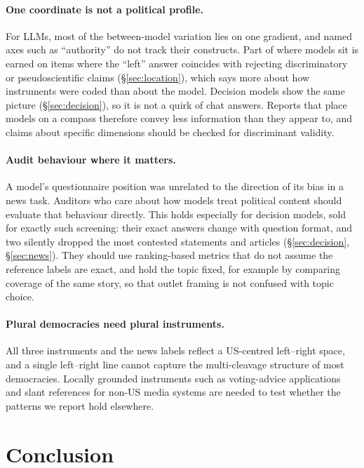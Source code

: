 \documentclass[11pt]{article}
\begin{document}
\paragraph{One coordinate is not a political profile.}
For LLMs, most of the between-model variation lies on one gradient, and named axes such as ``authority'' do not track their constructs. Part of where models sit is earned on items where the ``left'' answer coincides with rejecting discriminatory or pseudoscientific claims (\S\ref{sec:location}), which says more about how instruments were coded than about the model. Decision models show the same picture (\S\ref{sec:decision}), so it is not a quirk of chat answers. Reports that place models on a compass therefore convey less information than they appear to, and claims about specific dimensions should be checked for discriminant validity.

\paragraph{Audit behaviour where it matters.}
A model's questionnaire position was unrelated to the direction of its bias in a news task. Auditors who care about how models treat political content should evaluate that behaviour directly. This holds especially for decision models, sold for exactly such screening: their exact answers change with question format, and two silently dropped the most contested statements and articles (\S\ref{sec:decision}, \S\ref{sec:news}). They should use ranking-based metrics that do not assume the reference labels are exact, and hold the topic fixed, for example by comparing coverage of the same story, so that outlet framing is not confused with topic choice.

\paragraph{Plural democracies need plural instruments.}
All three instruments and the news labels reflect a US-centred left--right space, and a single left--right line cannot capture the multi-cleavage structure of most democracies. Locally grounded instruments such as voting-advice applications \citep{ceron-etal-2024-beyond} and slant references for non-US media systems \citep{prama-islam-2025-evaluating} are needed to test whether the patterns we report hold elsewhere.

\section{Conclusion}
\end{document}
